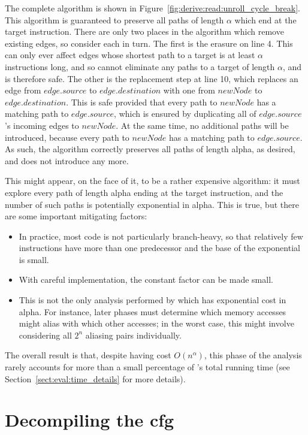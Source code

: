 The complete algorithm is shown in
Figure~\ref{fig:derive:read:unroll_cycle_break}.  This algorithm is
guaranteed to preserve all paths of length $\alpha$ which end at the
target instruction.  There are only two places in the algorithm which
remove existing edges, so consider each in turn.  The first is the
erasure on line 4.  This can only ever affect edges whose shortest
path to a target is at least $\alpha$ instructions long, and so cannot
eliminate any paths to a target of length $\alpha$, and is therefore
safe.  The other is the replacement step at line 10, which replaces an
edge from $edge.source$ to $edge.destination$ with one from $newNode$
to $edge.destination$.  This is safe provided that every path to
$newNode$ has a matching path to $edge.source$, which is ensured by
duplicating all of $edge.source$'s incoming edges to $newNode$.  At
the same time, no additional paths will be introduced, because every
path to $newNode$ has a matching path to $edge.source$.  As such, the
algorithm correctly preserves all paths of length \gls{alpha},
as desired, and does not introduce any more.

This might appear, on the face of it, to be a rather expensive
algorithm: it must explore every path of length \gls{alpha}
ending at the target instruction, and the number of such paths is
potentially exponential in \gls{alpha}.  This is true, but
there are some important mitigating factors:

\begin{itemize}
\item In practice, most code is not particularly branch-heavy, so that
  relatively few instructions have more than one predecessor and the
  base of the exponential is small.
\item With careful implementation, the constant factor can be made
  small.
\item This is not the only analysis performed by {\technique} which
  has exponential cost in \gls{alpha}.  For instance, later
  phases must determine which memory accesses might alias with which
  other accesses; in the worst case, this might involve considering
  all $2^n$ aliasing pairs individually.
\end{itemize}

The overall result is that, despite having cost $O(n^{\alpha})$, this
phase of the analysis rarely accounts for more than a small percentage
of {\implementation}'s total running time (see
Section~\ref{sect:eval:time_details} for more details).

\section[Decompiling the \glsentrytext{cfg}]{Decompiling the \gls{cfg}}
\label{sect:derive:state_machines}

